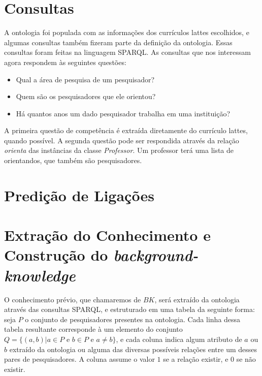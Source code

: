 \section{Consultas}
\label{sec:desenvolvimento-consultas}

A ontologia foi populada com as informações dos currículos lattes escolhidos, e algumas consultas também fizeram parte da definição da ontologia. Essas consultas foram feitas na linguagem SPARQL. As consultas que nos interessam agora respondem às seguintes questões:

\begin{itemize}
    \item Qual a área de pesquisa de um pesquisador?
    \item Quem são os pesquisadores que ele orientou?
    \item Há quantos anos um dado pesquisador trabalha em uma instituição?
\end{itemize}

A primeira questão de competência é extraída diretamente do currículo lattes, quando possível. A segunda questão pode ser respondida através da relação \textit{orienta} das instâncias da classe \textit{Professor}. Um professor terá uma lista de orientandos, que também são pesquisadores.

\section{Predição de Ligações}
\label{sec:desenvolvimento-predicao}



\section{Extração do Conhecimento e Construção do \textit{background-knowledge}}
\label{sec:desenvolvimento-background-knowledge}


O conhecimento prévio, que chamaremos de $BK$, será extraído da ontologia através das consultas SPARQL, e estruturado em uma tabela da seguinte forma: seja $P$ o conjunto de pesquisadores presentes na ontologia. Cada linha dessa tabela resultante corresponde à um elemento do conjunto $Q = \{ (a, b) | a \in P \text{ e } b \in P \text{ e } a \neq b \}$, e cada coluna indica algum atributo de $a$ ou $b$ extraído da ontologia ou alguma das diversas possíveis relações entre um desses pares de pesquisadores. A coluna assume o valor $1$ se a relação existir, e $0$ se não existir.

